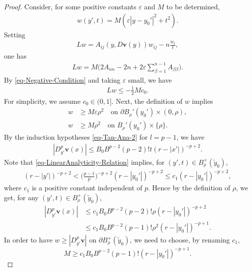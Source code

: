 \documentclass[11pt,reqno]{amsart}
\renewcommand{\leq}{\leqslant}
\renewcommand{\geq}{\geqslant}
\theoremstyle{definition}
\numberwithin{equation}{section}
\begin{document}
\begin{proof}
Consider, for some positive constants $\varepsilon$ and $M$ to be determined, 
\begin{align}{w}(y',t)=M(\varepsilon|y-y_0'|^2+t^2).\end{align}
Setting
\begin{align}
    L w = A_{ij}(y, D\mathbf v(y))w_{ij} - n \frac{w_{t}}{t},
\end{align}
one has
\begin{align}
L w=M\Big(2 A_{nn}-2n + 2\varepsilon\sum_{\beta=1}^{n-1}A_{\beta\beta}\Big).
\label{TS72}
\end{align}
By \eqref{eq-Negative-Condition} and taking $\varepsilon$ small, we have 
\begin{align}Lw\leq -\frac12Mc_0.\end{align}
For simplicity, we assume $c_0\in (0,1]$. 
Next, the definition of $w$ implies  
\begin{align} 
w&\geq  M\varepsilon \rho^2\quad\text{on }\partial B_\rho'(y_0')\times (0,\rho),\\
w&\geq  M\rho^2\quad\text{on }B_\rho'(y_0')\times\{\rho\}.\end{align}
By the induction hypotheses 
\eqref{eq-Tan-Ana-2} for $l=p-1$, we have 
\begin{align}|D_{y'}^p \mathbf v(x)|\leq B_0B^{p-2}(p-2)!t(r-|x'|)^{-p+2}.\end{align}
Note that \eqref{eq-LinearAnalyticity-Relation} implies, for $(y',t)\in B^+_\rho(\tilde y_0)$,  
\begin{align}(r-|y'|)^{-p+2}<\Big(\frac{p-1}{p}\Big)^{-p+2}(r-|y_0'|)^{-p+2}
\leq c_1(r-|y_0'|)^{-p+2},\end{align}
where $c_1$ is a positive constant independent of $p$. Hence by the definition of $\rho$, we get, 
for any $(y',t)\in B^+_\rho(\tilde y_0)$, 
\begin{align} |D_{y'}^p\mathbf v(x)|&\leq c_1B_0B^{p-2}(p-2)!\rho(r-|y_0'|)^{-p+2}\\
&\leq c_1B_0B^{p-2}(p-1)!\rho^2(r-|y_0'|)^{-p+1}.\end{align}
In order to have $w\geq  |D_{y'}^p \mathbf v|$ on $\partial B^+_\rho(\tilde y_0)$, we need to choose, 
by renaming $c_1$,  
\begin{equation}\label{eq-LinearAnalyticity-ChoiceM1}
M\geq  c_1B_0B^{p-2}(p-1)!(r-|y_0'|)^{-p+1}.\end{equation}


\end{proof}
\end{document}
